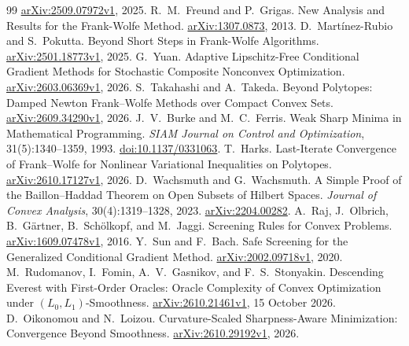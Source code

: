 \begin{thebibliography}{99}
\href{https://arxiv.org/abs/2509.07972v1}{arXiv:2509.07972v1}, 2025.
 R.~M.~Freund and P.~Grigas.
New Analysis and Results for the Frank-Wolfe Method.
\href{https://arxiv.org/abs/1307.0873}{arXiv:1307.0873}, 2013.
 D.~Mart\'inez-Rubio and S.~Pokutta.
Beyond Short Steps in Frank-Wolfe Algorithms.
\href{https://arxiv.org/abs/2501.18773v1}{arXiv:2501.18773v1}, 2025.
 G.~Yuan.
Adaptive Lipschitz-Free Conditional Gradient Methods for Stochastic
Composite Nonconvex Optimization.
\href{https://arxiv.org/abs/2603.06369v1}{arXiv:2603.06369v1}, 2026.
 S.~Takahashi and A.~Takeda.
Beyond Polytopes: Damped Newton Frank--Wolfe Methods over Compact Convex Sets.
\href{https://arxiv.org/abs/2609.34290v1}{arXiv:2609.34290v1}, 2026.
 J.~V.~Burke and M.~C.~Ferris.
Weak Sharp Minima in Mathematical Programming.
\emph{SIAM Journal on Control and Optimization}, 31(5):1340--1359, 1993.
\href{https://doi.org/10.1137/0331063}{doi:10.1137/0331063}.
 T.~Harks.
Last-Iterate Convergence of Frank--Wolfe for Nonlinear Variational
Inequalities on Polytopes.
\href{https://arxiv.org/abs/2610.17127v1}{arXiv:2610.17127v1}, 2026.
 D.~Wachsmuth and G.~Wachsmuth.
A Simple Proof of the Baillon--Haddad Theorem on Open Subsets of Hilbert
Spaces. \emph{Journal of Convex Analysis}, 30(4):1319--1328, 2023.
\href{https://arxiv.org/abs/2204.00282}{arXiv:2204.00282}.
 A.~Raj, J.~Olbrich, B.~G\"artner, B.~Sch\"olkopf, and
M.~Jaggi. Screening Rules for Convex Problems.
\href{https://arxiv.org/abs/1609.07478v1}{arXiv:1609.07478v1}, 2016.
 Y.~Sun and F.~Bach.
Safe Screening for the Generalized Conditional Gradient Method.
\href{https://arxiv.org/abs/2002.09718v1}{arXiv:2002.09718v1}, 2020.
 M.~Rudomanov, I.~Fomin, A.~V.~Gasnikov, and
F.~S.~Stonyakin. Descending Everest with First-Order Oracles: Oracle
Complexity of Convex Optimization under $(L_0,L_1)$-Smoothness.
\href{https://arxiv.org/abs/2610.21461v1}{arXiv:2610.21461v1}, 15 October 2026.
 D.~Oikonomou and N.~Loizou.
Curvature-Scaled Sharpness-Aware Minimization: Convergence Beyond
Smoothness. \href{https://arxiv.org/html/2610.29192v1}{arXiv:2610.29192v1},
2026.\end{thebibliography}




